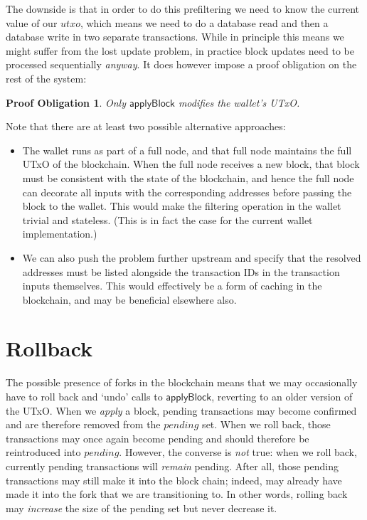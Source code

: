 \documentclass{article}
\newtheorem{proofobligation}[lemma]{Proof Obligation}
\numberwithin{equation}{lemma}
\begin{document}
The downside is that in order to do this prefiltering we need to know the
current value of our $utxo$, which means we need to do a database read and then
a database write in two separate transactions. While in principle this means
we might suffer from the lost update problem, in practice block updates need to
be processed sequentially \emph{anyway}. It does however impose a proof
obligation on the rest of the system:

\begin{proofobligation}
Only $\mathsf{applyBlock}$ modifies the wallet's UTxO.
\end{proofobligation}

Note that there are at least two possible alternative approaches:

\begin{itemize}
\item The wallet runs as part of a full node, and that full node maintains
the full UTxO of the blockchain. When the full node receives a new block,
that block must be consistent with the state of the blockchain, and hence
the full node can decorate all inputs with the corresponding addresses before
passing the block to the wallet. This would make the filtering operation in
the wallet trivial and stateless. (This is in fact the case for the current
wallet implementation.)
\item We can also push the problem further upstream and specify that the
resolved addresses must be listed alongside the transaction IDs in the
transaction inputs themselves. This would effectively be a form of caching
in the blockchain, and may be beneficial elsewhere also.
\end{itemize}

\section{Rollback}
\label{sec:rollback}

The possible presence of forks in the blockchain means that we may occasionally
have to roll back and `undo' calls to $\mathsf{applyBlock}$, reverting to an
older version of the UTxO. When we \emph{apply} a block, pending transactions
may become confirmed and are therefore removed from the $\mathit{pending}$ set.
When we roll back, those transactions may once again become pending and should
therefore be reintroduced into $\mathit{pending}$. However, the converse is
\emph{not} true: when we roll back, currently pending transactions will
\emph{remain} pending. After all, those pending transactions may still make it
into the block chain; indeed, may already have made it into the fork that we are
transitioning to. In other words, rolling back may \emph{increase} the size of
the pending set but never decrease it.
\end{document}

